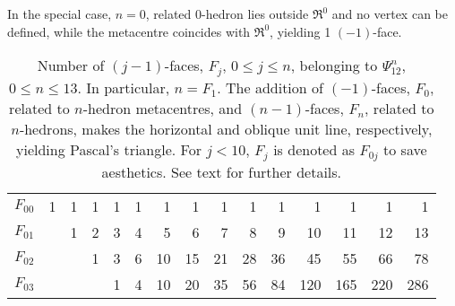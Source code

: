 \documentclass[12pt,a4paper]{article}
\begin{document}
 In the special case, $n=0$,
related 0-hedron lies outside  $\Re^0$ and no vertex can be defined, while the
metacentre coincides with $\Re^0$, yielding 1 $(-1)$-face.
%                           
\begin{table}
\caption{Number of $(j-1)$-faces, $F_j$, $0\le j\le n$, belonging to
$\Psi_{12}^n$, $0\le n\le13$.   In particular, $n=F_1$.   The addition of
$(-1)$-faces, $F_0$, related to $n$-hedron metacentres, and $(n-1)$-faces,
$F_n$, related to $n$-hedrons, makes the horizontal and oblique unit line,
respectively, yielding Pascal's triangle.   For $j<10$, $F_j$ is denoted as
$F_{0j}$ to save aesthetics.   See text for further details.}
\label{t:face}
\begin{center}
\begin{tabular}{|r|r|r|r|r|r|r|r|r|r|r|r|r|r|r|} \hline
\hline
$F_{00}$ & 1 & 1         &  1 &  1                  &  1                  &   1                  &   1 &   1 &   1 &   1                  &   1                 &   1                 &   1 &    1                     \\
$F_{01}$ &   & 1         &  2 &  3                  &  4                  &   5                  &   6 &   7 &   8 &   9                  &  10                 &  11                 &  12 &   13                     \\
$F_{02}$ &   &           &  1 &  3                  &  6                  &  10                  &  15 &  21 &  28 &  36                  &  45                 &  55                 &  66 &   78                     \\
$F_{03}$ &   &           &    &  1                  &  4                  &  10                  &  20 &  35 &  56 &  84                  & 120                 & 165                 & 220 &  286                     \\

\end{tabular}
\end{center}
\end{table}
\end{document}
